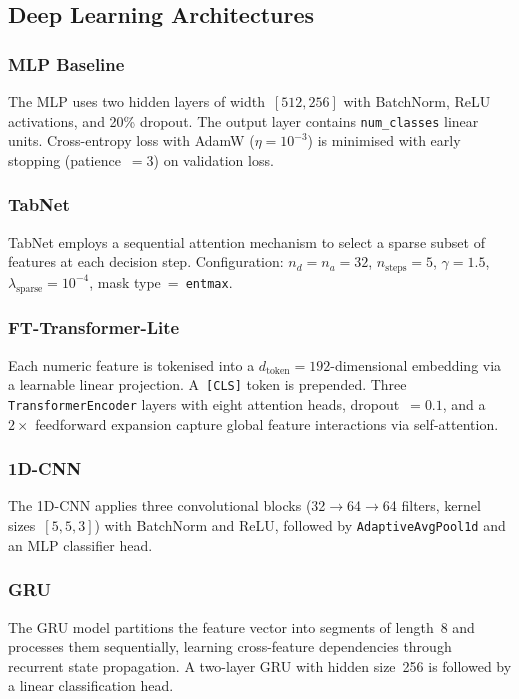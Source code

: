 \documentclass[conference]{IEEEtran}
\begin{document}
\subsection{Deep Learning Architectures}

\subsubsection{MLP Baseline}
The MLP uses two hidden layers of width~$[512,256]$ with BatchNorm, ReLU
activations, and 20\% dropout.  The output layer contains \texttt{num\_classes}
linear units.  Cross-entropy loss with AdamW ($\eta=10^{-3}$) is minimised
with early stopping (patience~$=3$) on validation loss.

\subsubsection{TabNet}
TabNet employs a sequential attention mechanism to select a sparse subset of
features at each decision step.  Configuration: $n_d=n_a=32$, $n_{\text{steps}}=5$,
$\gamma=1.5$, $\lambda_{\text{sparse}}=10^{-4}$, mask type~=~\texttt{entmax}.

\subsubsection{FT-Transformer-Lite}
Each numeric feature is tokenised into a $d_{\text{token}}=192$-dimensional
embedding via a learnable linear projection.  A~\texttt{[CLS]} token is
prepended.  Three \texttt{TransformerEncoder} layers with eight attention
heads, dropout~$=0.1$, and a~$2\times$ feedforward expansion capture global
feature interactions via self-attention.

\subsubsection{1D-CNN}
The 1D-CNN applies three convolutional blocks (32$\to$64$\to$64 filters,
kernel sizes~$[5,5,3]$) with BatchNorm and ReLU, followed by
\texttt{AdaptiveAvgPool1d} and an MLP classifier head.

\subsubsection{GRU}
The GRU model partitions the feature vector into segments of length~8 and
processes them sequentially, learning cross-feature dependencies through
recurrent state propagation.  A two-layer GRU with hidden size~256 is
followed by a linear classification head.
\end{document}
